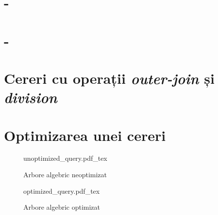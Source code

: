 \documentclass[a4paper, oneside, 12pt]{article}
\newcommand{\incfig}[1]{%
    \def\svgwidth{\columnwidth}
    {#1.pdf_tex}
}
\begin{document}
\section{-}

\section{-}

\section{Cereri cu operații \emph{outer-join} și \emph{division}}

\begin{center}

\minipage{\linewidth}

\endminipage

\end{center}

\section{Optimizarea unei cereri}





\begin{center}

\minipage{\linewidth}

\endminipage

\end{center}

\begin{center}

\minipage{\linewidth}

\endminipage

\end{center}

\begin{figure}[H]
    \centering
    \incfig{unoptimized_query}
    \caption{Arbore algebric neoptimizat}
\end{figure}

\begin{figure}[H]
    \centering
    \incfig{optimized_query}
    \caption{Arbore algebric optimizat}
\end{figure}
\end{document}
